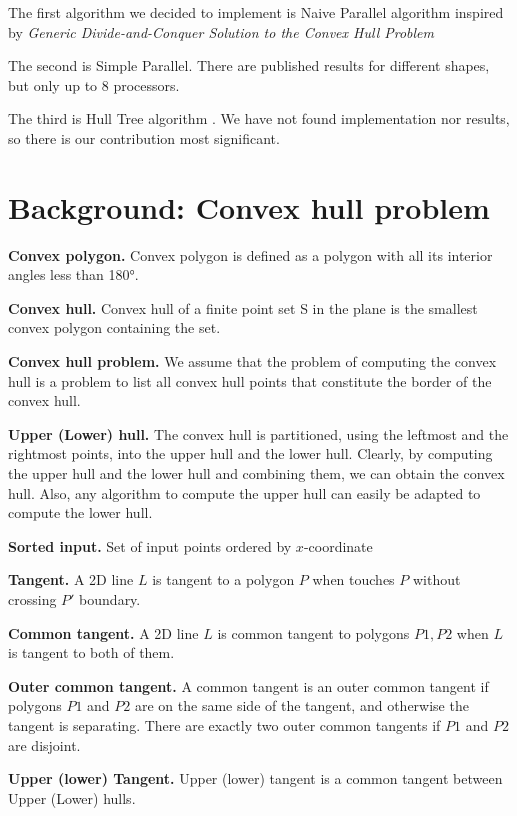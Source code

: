 \documentclass[letterpaper]{article}
\newcommand{\mypar}[1]{{\bf #1.}}
\theoremstyle{definition}
\begin{document}
The first algorithm we decided to implement is Naive Parallel algorithm inspired by \textit{Generic Divide-and-Conquer Solution to the Convex Hull Problem} \cite{NaiveParallel} 

The second is Simple Parallel. \cite{SimpleParallel}  There are published results for different shapes, but only up to 8 processors.   
 
The third is Hull Tree algorithm \cite{HullTree}. We have not found implementation nor results, so there is our contribution most significant.
     
\section{Background: Convex hull problem}\label{sec:background}

\mypar{Convex polygon} Convex polygon is defined as a polygon with all its interior angles less than 180°.

\mypar{Convex hull}
Convex hull of a finite point set S in the plane is the smallest convex polygon containing the set.

\mypar{Convex hull problem}
We assume that the problem of computing the convex hull is a problem to list all convex hull points that constitute the border of the convex hull. 

\mypar{Upper (Lower) hull}
The convex hull is partitioned, using the leftmost and the rightmost points, into the upper
hull and the lower hull. Clearly, by computing the upper hull and the lower hull and combining them, we can obtain the convex hull. Also, any algorithm to compute the upper hull can easily be adapted to compute the lower hull.

\mypar{Sorted input} 
Set of input points ordered by $x$-coordinate

\mypar{Tangent} 
 A 2D line $L$ is tangent to a polygon $P$ when touches $P$ without crossing $P'$ boundary.

\mypar{Common tangent} 
A 2D line $L$ is common tangent to polygons $P1, P2$ when $L$ is tangent to both of them. 

\mypar{Outer common tangent}
A common tangent is an outer common tangent if polygons $P1$ and $P2$ are on the same side of the tangent, and otherwise the tangent is separating.
There are exactly two outer common tangents if $P1$ and $P2$ are disjoint. \cite{DBLP:journals/corr/Abrahamsen15}  

\mypar{Upper (lower) Tangent}
Upper (lower) tangent is a common tangent between Upper (Lower) hulls. 
\end{document}
